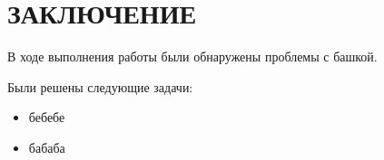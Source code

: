 \section*{ЗАКЛЮЧЕНИЕ}
В ходе выполнения работы были обнаружены проблемы с башкой.

Были решены следующие задачи:
\begin{itemize}
	\item бебебе
	\item бабаба
\end{itemize}

\pagebreak